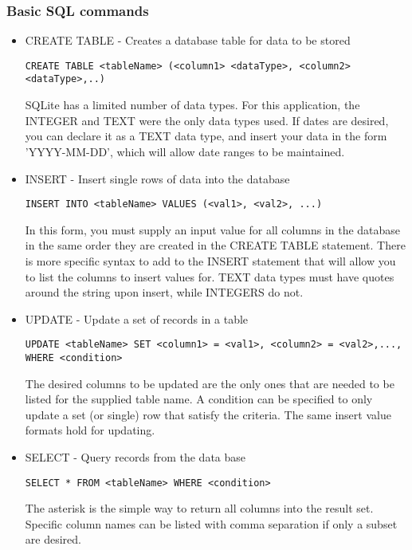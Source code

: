\documentclass{article}
\begin{document}
\subsubsection{Basic SQL commands}
\begin{itemize}
\item CREATE TABLE - Creates a database table for data to be stored \\
\begin{verbatim}
CREATE TABLE <tableName> (<column1> <dataType>, <column2> <dataType>,..)
\end{verbatim}
SQLite has a limited number of data types. For this application, the INTEGER and TEXT were the only data types used. If dates are desired, you can declare it as a TEXT data type, and insert your data in the form 'YYYY-MM-DD', which will allow date ranges to be maintained.

\item INSERT - Insert single rows of data into the database \\
\begin{verbatim}
INSERT INTO <tableName> VALUES (<val1>, <val2>, ...)
\end{verbatim}
In this form, you must supply an input value for all columns in the database in the same order they are created in the CREATE TABLE statement. There is more specific syntax to add to the INSERT statement that will allow you to list the columns to insert values for. TEXT data types must have quotes around the string upon insert, while INTEGERS do not. 

\item UPDATE - Update a set of records in a table \\
\begin{verbatim}
UPDATE <tableName> SET <column1> = <val1>, <column2> = <val2>,..., WHERE <condition>
\end{verbatim}
The desired columns to be updated are the only ones that are needed to be listed for the supplied table name. A condition can be specified to only update a set (or single) row that satisfy the criteria. The same insert value formats hold for updating.

\item SELECT - Query records from the data base \\
\begin{verbatim}
SELECT * FROM <tableName> WHERE <condition>
\end{verbatim}
The asterisk is the simple way to return all columns into the result set. Specific column names can be listed with comma separation if only a subset are desired.
\end{itemize}
\end{document}
